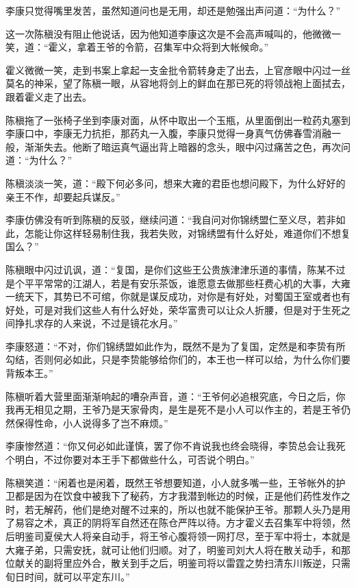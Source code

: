 李康只觉得嘴里发苦，虽然知道问也是无用，却还是勉强出声问道：“为什么？”

这一次陈稹没有阻止他说话，因为他知道李康这次是不会高声喊叫的，他微微一笑，道：“霍义，拿着王爷的令箭，召集军中众将到大帐候命。”

霍义微微一笑，走到书案上拿起一支金批令箭转身走了出去，上官彦眼中闪过一丝莫名的神采，望了陈稹一眼，从容地将剑上的鲜血在那已死的将领战袍上面拭去，跟着霍义走了出去。

陈稹拖了一张椅子坐到李康对面，从怀中取出一个玉瓶，从里面倒出一粒药丸塞到李康口中，李康无力抗拒，那药丸一入腹，李康只觉得一身真气仿佛春雪消融一般，渐渐失去。他断了暗运真气逼出背上暗器的念头，眼中闪过痛苦之色，再次问道：“为什么？”

陈稹淡淡一笑，道：“殿下何必多问，想来大雍的君臣也想问殿下，为什么好好的亲王不作，却要起兵谋反。”

李康仿佛没有听到陈稹的反驳，继续问道：“我自问对你锦绣盟仁至义尽，若非如此，怎能让你这样轻易制住我，我若失败，对锦绣盟有什么好处，难道你们不想复国么？”

陈稹眼中闪过讥讽，道：“复国，是你们这些王公贵族津津乐道的事情，陈某不过是个平平常常的江湖人，若是有安乐茶饭，谁愿意去做那些枉费心机的大事，大雍一统天下，其势已不可绾，你就是谋反成功，对你是有好处，对蜀国王室或者也有好处，可是对我们这些人有什么好处，荣华富贵可以让众人折腰，但是对于生死之间挣扎求存的人来说，不过是镜花水月。”

李康怒道：“不对，你们锦绣盟如此作为，既然不是为了复国，定然是和李贽有所勾结，否则何必如此，只是李贽能够给你们的，本王也一样可以给，为什么你们要背叛本王。”

陈稹听着大营里面渐渐响起的嘈杂声音，道：“王爷何必追根究底，今日之后，你我再无相见之期，王爷乃是天家骨肉，是生是死不是小人可以作主的，若是王爷仍然保得性命，小人说得多了岂不麻烦。”

李康惨然道：“你又何必如此谨慎，罢了你不肯说我也终会晓得，李贽总会让我死个明白，不过你要对本王手下都做些什么，可否说个明白。”

陈稹笑道：“闲着也是闲着，既然王爷想要知道，小人就多嘴一些，王爷帐外的护卫都是因为在饮食中被我下了秘药，方才我潜到帐边的时候，正是他们药性发作之时，若无解药，他们是绝对醒不过来的，所以也就不能保护王爷。那颗人头乃是用了易容之术，真正的阴将军自然还在陈仓严阵以待。方才霍义去召集军中将领，然后明鉴司夏侯大人将亲自动手，将王爷心腹将领一网打尽，至于军中将士，本就是大雍子弟，只需安抚，就可让他们归顺。对了，明鉴司刘大人将在散关动手，和那位献关的副将里应外合，散关到手之后，明鉴司将以雷霆之势扫清东川叛逆，只需旬日时间，就可以平定东川。”


